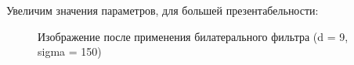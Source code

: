 \documentclass[14pt,a4paper,report]{report}
\begin{document}
Увеличим значения параметров, для большей презентабельности:

\begin{figure}[h]
\begin{minipage}[h]{0.47\linewidth}
\end{minipage}
\hfill
\begin{minipage}[h]{0.47\linewidth}
\end{minipage}
\caption{Изображение после применения билатерального фильтра (d = 9, sigma = 150)}
\label{ris:image1}
\end{figure}
\end{document}
